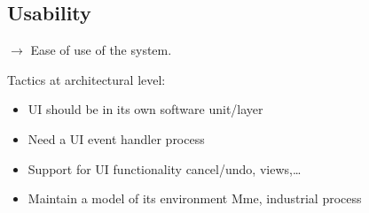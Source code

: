 \subsection{Usability}
$\rightarrow$ Ease of use of the system.

Tactics at architectural level:
\begin{itemize}
    \item UI should be in its own software unit/layer
    \item Need a UI event handler process
    \item Support for UI functionality cancel/undo, views,\ldots
    \item Maintain a model of its environment Mme, industrial process
\end{itemize}

